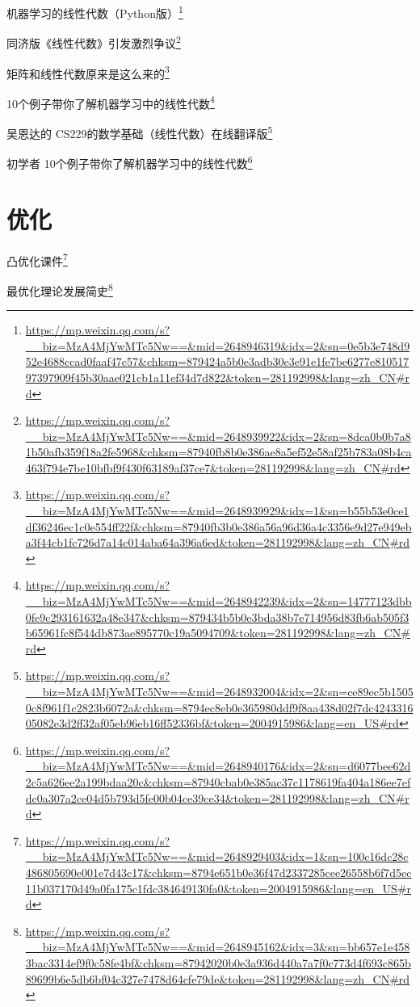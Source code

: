 \documentclass[]{ctexbook}
\renewcommand{\href}[2]{#2\footnote{\url{#1}}}
\begin{document}
\href{https://mp.weixin.qq.com/s?__biz=MzA4MjYwMTc5Nw==\&mid=2648946319\&idx=2\&sn=0e5b3e748d952e4688ccad0faaf47c57\&chksm=879424a5b0e3adb30e3e91e1fe7be6277e81051797397909f45b30aae021cb1a11ef34d7d822\&token=281192998\&lang=zh_CN\#rd}{机器学习的线性代数（Python版）}

\href{https://mp.weixin.qq.com/s?__biz=MzA4MjYwMTc5Nw==\&mid=2648939922\&idx=2\&sn=8dca0b0b7a81b50afb359f18a2fe5968\&chksm=87940fb8b0e386ae8a5ef52e58af25b783a08b4ca463f794e7be10bfbf9f430f63189af37ce7\&token=281192998\&lang=zh_CN\#rd}{同济版《线性代数》引发激烈争议}

\href{https://mp.weixin.qq.com/s?__biz=MzA4MjYwMTc5Nw==\&mid=2648939929\&idx=1\&sn=b55b53e0ce1df36246ec1c0e554ff22f\&chksm=87940fb3b0e386a56a96d36a4c3356e9d27e949eba3f44cb1fc726d7a14c014aba64a396a6ed\&token=281192998\&lang=zh_CN\#rd}{矩阵和线性代数原来是这么来的}

\href{https://mp.weixin.qq.com/s?__biz=MzA4MjYwMTc5Nw==\&mid=2648942239\&idx=2\&sn=14777123dbb0fe9c293161632a48e347\&chksm=879434b5b0e3bda38b7e714956d83fb6ab505f3b65961fc8f544db873ae895770c19a5094709\&token=281192998\&lang=zh_CN\#rd}{10个例子带你了解机器学习中的线性代数}

\href{https://mp.weixin.qq.com/s?__biz=MzA4MjYwMTc5Nw==\&mid=2648932004\&idx=2\&sn=ce89ec5b15050c8f961f1c2823b6072a\&chksm=8794ec8eb0e365980ddf9f8aa438d02f7dc424331605082e3d2ff32af05eb96eb16ff52336bf\&token=2004915986\&lang=en_US\#rd}{吴恩达的 CS229的数学基础（线性代数）在线翻译版}

\href{https://mp.weixin.qq.com/s?__biz=MzA4MjYwMTc5Nw==\&mid=2648940176\&idx=2\&sn=d6077bee62d2c5a626ee2a199bdaa20c\&chksm=87940cbab0e385ac37c1178619fa404a186ee7efdc0a307a2ce04d5b793d5fe00b04ce39ce34\&token=281192998\&lang=zh_CN\#rd}{初学者 \textbar{} 10个例子带你了解机器学习中的线性代数}

\hypertarget{ux4f18ux5316}{%
\section{优化}\label{ux4f18ux5316}}

\href{https://mp.weixin.qq.com/s?__biz=MzA4MjYwMTc5Nw==\&mid=2648929403\&idx=1\&sn=100c16dc28c486805690e001e7d43c17\&chksm=8794e651b0e36f47d2337285cee26558b6f7d5ec11b037170d49a0fa175c1fdc384649130fa0\&token=2004915986\&lang=en_US\#rd}{凸优化课件}

\href{https://mp.weixin.qq.com/s?__biz=MzA4MjYwMTc5Nw==\&mid=2648945162\&idx=3\&sn=bb657e1e4583bac3314ef9f0c58fe4bf\&chksm=87942020b0e3a936d440a7a7f0c773d4f693c865b89699b6e5db6bf04c327e7478d64cfe79de\&token=281192998\&lang=zh_CN\#rd}{最优化理论发展简史}
\end{document}
